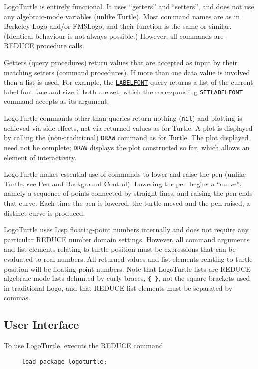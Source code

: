 LogoTurtle is entirely functional.  It uses ``getters'' and
``setters'', and does not use any algebraic-mode variables (unlike
Turtle).  Most command names are as in Berkeley Logo and/or FMSLogo,
and their function is the same or similar.  (Identical behaviour is
not always possible.)  However, all commands are REDUCE procedure
calls.

Getters (query procedures) return values that are accepted as input by
their matching setters (command procedures).  If more than one data
value is involved then a list is used.  For example, the
\hyperref[logoturtle:labelfont]{\texttt{LABELFONT}} query returns a
list of the current label font face and size if both are set, which
the corresponding
\hyperref[logoturtle:setlabelfont]{\texttt{SETLABELFONT}} command
accepts as its argument.

LogoTurtle commands other than queries return nothing (\texttt{nil})
and plotting is achieved via side effects, not via returned values as
for Turtle.  A plot is displayed by calling the (non-traditional)
\hyperref[logoturtle:draw]{\texttt{DRAW}} command as for Turtle.  The
plot displayed need not be complete; \texttt{DRAW} displays the plot
constructed so far, which allows an element of interactivity.

LogoTurtle makes essential use of commands to lower and raise the pen
(unlike Turtle; see \hyperref[logoturtle:PBC]{Pen and Background
  Control}).  Lowering the pen begins a ``curve'', namely a sequence
of points connected by straight lines, and raising the pen ends that
curve.  Each time the pen is lowered, the turtle moved and the pen
raised, a distinct curve is produced.

LogoTurtle uses Lisp floating-point numbers internally and does not
require any particular REDUCE number domain settings.  However, all
command arguments and list elements relating to turtle position must
be expressions that can be evaluated to real numbers.  All returned
values and list elements relating to turtle position will be
floating-point numbers.  Note that LogoTurtle lists are REDUCE
algebraic-mode lists delimited by curly braces, \texttt{\{~\}}, not
the square brackets used in traditional Logo, and that REDUCE list
elements must be separated by commas.


\subsection{User Interface}

To use LogoTurtle, execute the REDUCE command
\begin{verbatim}
     load_package logoturtle;
\end{verbatim}

